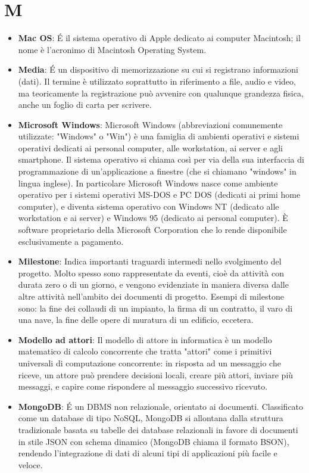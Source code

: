 \section{M}
\begin{itemize} 
	\item
	\textbf{Mac OS}: É il sistema operativo di Apple dedicato ai computer Macintosh; il nome è l'acronimo di Macintosh Operating System.
	\item
	\textbf{Media}: É un dispositivo di memorizzazione su cui si registrano informazioni (dati). Il termine è utilizzato soprattutto in riferimento a file, audio e video, ma teoricamente la registrazione può avvenire con qualunque grandezza fisica, anche un foglio di carta per scrivere.
	\item
	\textbf{Microsoft Windows}: Microsoft Windows (abbreviazioni comunemente utilizzate: "Windows" o "Win") è una famiglia di ambienti operativi e sistemi operativi dedicati ai personal computer, alle workstation, ai server e agli smartphone. Il sistema operativo si chiama così per via della sua interfaccia di programmazione di un'applicazione a finestre (che si chiamano "windows" in lingua inglese).
	In particolare Microsoft Windows nasce come ambiente operativo per i sistemi operativi MS-DOS e PC DOS (dedicati ai primi home computer), e diventa sistema operativo con Windows NT (dedicato alle workstation e ai server) e Windows 95 (dedicato ai personal computer). È software proprietario della Microsoft Corporation che lo rende disponibile esclusivamente a pagamento.
	\item
	\textbf{Milestone}: Indica importanti traguardi intermedi nello svolgimento del progetto. Molto spesso sono rappresentate da eventi, cioè da attività con durata zero o di un giorno, e vengono evidenziate in maniera diversa dalle altre attività nell'ambito dei documenti di progetto. Esempi di milestone sono: la fine dei collaudi di un impianto, la firma di un contratto, il varo di una nave, la fine delle opere di muratura di un edificio, eccetera.
	\item
	\textbf{Modello ad attori}: Il modello di attore in informatica è un modello matematico di calcolo concorrente che tratta "attori" come i primitivi universali di computazione concorrente: in risposta ad un messaggio che riceve, un attore può prendere decisioni locali, creare più attori, inviare più messaggi, e capire come rispondere al messaggio successivo ricevuto. 
	\item
	\textbf{MongoDB}: É un DBMS non relazionale, orientato ai documenti. Classificato come un database di tipo NoSQL, MongoDB si allontana dalla struttura tradizionale basata su tabelle dei database relazionali in favore di documenti in stile JSON con schema dinamico (MongoDB chiama il formato BSON), rendendo l'integrazione di dati di alcuni tipi di applicazioni più facile e veloce.  
\end{itemize}
